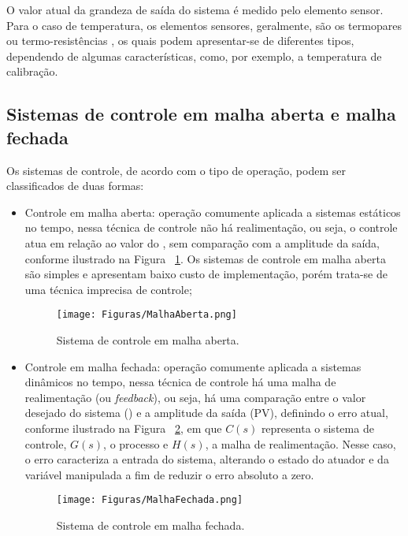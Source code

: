         O valor atual da grandeza de saída do sistema é medido pelo elemento sensor. Para o caso de temperatura, os elementos sensores, geralmente, são os termopares ou termo-resistências \cite{Fundamentos_SistemasControle}, os quais podem apresentar-se de diferentes tipos, dependendo de algumas características, como, por exemplo, a temperatura de calibração.
    \subsection{Sistemas de controle em malha aberta e malha fechada}
        Os sistemas de controle, de acordo com o tipo de operação, podem ser classificados de duas formas:
    
        \begin{itemize}
            \item Controle em malha aberta: operação comumente aplicada a sistemas estáticos no tempo, nessa técnica de controle não há realimentação, ou seja, o controle atua em relação ao valor do \SetPoint, sem comparação com a amplitude da saída, conforme ilustrado na Figura ~\ref{fig:MalhaAberta}. Os sistemas de controle em malha aberta são simples e apresentam baixo custo de implementação, porém trata-se de uma técnica imprecisa de controle;
            \begin{figure}[H]
                \centering
                \texttt{[image: Figuras/MalhaAberta.png]}
                \caption{Sistema de controle em malha aberta.} \label{fig:MalhaAberta}
            \end{figure}
            
            \item Controle em malha fechada: operação comumente aplicada a sistemas dinâmicos no tempo, nessa técnica de controle há uma malha de realimentação (ou \textit{feedback}), ou seja, há uma comparação entre o valor desejado do sistema (\SetPoint) e a amplitude da saída (PV), definindo o erro atual, conforme ilustrado na Figura ~\ref{fig:MalhaFechada}, em que $C(s)$ representa o sistema de controle, $G(s)$, o processo e $H(s)$, a malha de realimentação. Nesse caso, o erro caracteriza a entrada do sistema, alterando o estado do atuador e da variável manipulada a fim de reduzir o erro absoluto a zero.
    
            \begin{figure}[H]
                \centering
                \texttt{[image: Figuras/MalhaFechada.png]}
                \caption{Sistema de controle em malha fechada.} \label{fig:MalhaFechada}
            \end{figure}
        \end{itemize}

